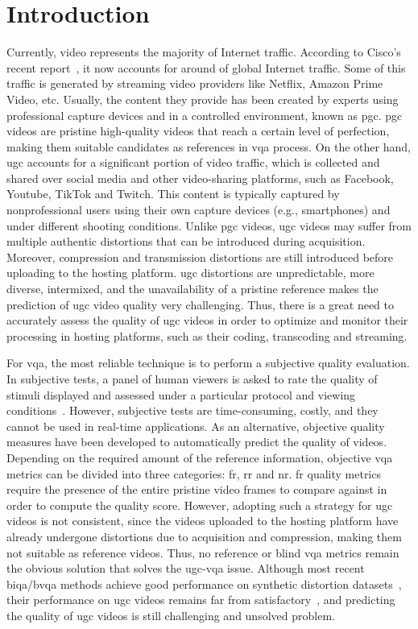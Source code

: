 \documentclass[journal]{IEEEtran}
\begin{document}
\section{Introduction}
Currently, video represents the majority of Internet traffic. According to Cisco's recent report~\cite{cisco2020cisco}, it now accounts for around  of global Internet traffic. Some of this traffic is generated by streaming video providers like Netflix, Amazon Prime Video, etc. Usually, the content they provide has been created by experts using professional capture devices and in a controlled environment, known as \ac{pgc}. \ac{pgc} videos are pristine high-quality videos that reach a certain level of perfection, making them suitable candidates as references in \ac{vqa} process. On the other hand, \ac{ugc} accounts for a significant portion of video traffic, which is collected and shared over social media and other video-sharing platforms, such as Facebook, Youtube, TikTok and Twitch. This content is typically captured by nonprofessional users using their own capture devices (e.g., smartphones) and under different shooting conditions. Unlike \ac{pgc} videos, \ac{ugc} videos may suffer from multiple authentic distortions that can be introduced during acquisition. Moreover, compression and transmission distortions are still introduced before uploading to the hosting platform. \ac{ugc} distortions are unpredictable, more diverse, intermixed, and the unavailability of a pristine reference makes the prediction of \ac{ugc} video quality very challenging. Thus, there is a great need to accurately assess the quality of \ac{ugc} videos in order to optimize and monitor their processing in hosting platforms, such as their coding, transcoding and streaming.

For \ac{vqa}, the most reliable technique is to perform a subjective quality evaluation. In subjective tests, a panel of human viewers is asked to rate the quality of stimuli displayed and assessed under a particular protocol and viewing conditions~\cite{bt2012500}. However, subjective tests are time-consuming, costly, and they cannot be used in real-time applications. As an alternative, objective quality measures have been developed to automatically predict the quality of videos. Depending on the required amount of the reference information, objective \ac{vqa} metrics can be divided into three categories: \ac{fr}, \ac{rr} and \ac{nr}. \Ac{fr} quality metrics require the presence of the entire pristine video frames to compare against in order to compute the quality score. However, adopting such a strategy for \ac{ugc} videos is not consistent, since the videos uploaded to the hosting platform have already undergone distortions due to acquisition and compression, making them not suitable as reference videos. Thus, no reference or blind \ac{vqa} metrics remain the obvious solution that solves the \ac{ugc}-\ac{vqa} issue. Although most recent \ac{biqa}/\ac{bvqa} methods achieve good performance on synthetic distortion datasets~\cite{seshadrinathan2010study}, their performance on \ac{ugc} videos remains far from satisfactory~\cite{tu2021ugc,hosu2017konstanz,sinno2018large,wang2019youtube,xu2021perceptual}, and predicting the quality of \ac{ugc} videos is still challenging and unsolved problem. 
\end{document}
